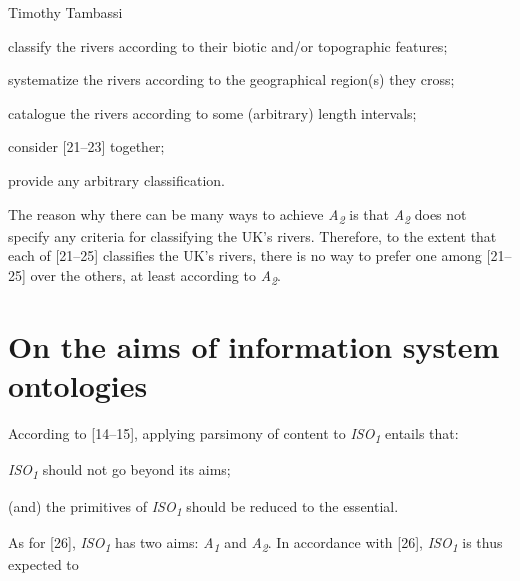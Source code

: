 \begin{artengenv}{Timothy Tambassi}
\begin{enumerate}[label={[\arabic*]}]
\setcounter{enumi}{\value{saveenumtambassi}}

\item classify the rivers according to their biotic and/or topographic features;

\item systematize the rivers according to the geographical region(s) they cross;

\item catalogue the rivers according to some (arbitrary) length intervals;

\item consider [21–23] together;

\item provide any arbitrary classification.

\end{enumerate}

The reason why there can be many ways to achieve \textit{A}\textit{\textsubscript{2}} is that \textit{A}\textit{\textsubscript{2}} does not specify any criteria for classifying the UK's rivers. Therefore, to the extent that each of [21–25] classifies the UK's rivers, there is no way to prefer one among [21–25] over the others, at least according to \textit{A}\textit{\textsubscript{2}}.



\section{On the aims of information system ontologies}

According to [14–15], applying parsimony of content to \textit{ISO}\textit{\textsubscript{1}} entails that:



\setcounter{saveenumtambassi}{\value{enumi}}

\begin{enumerate}[label={[\arabic*]}]

\setcounter{enumi}{\value{saveenumtambassi}}

\item \textit{ISO}\textit{\textsubscript{1}} should not go beyond its aims;

\item (and) the primitives of \textit{ISO}\textit{\textsubscript{1}} should be reduced to the essential.

\end{enumerate}

As for [26], \textit{ISO}\textit{\textsubscript{1}} has two aims: \textit{A}\textit{\textsubscript{1}} and \textit{A}\textit{\textsubscript{2}}. In accordance with [26], \textit{ISO}\textit{\textsubscript{1}} is thus expected to




\end{artengenv}
